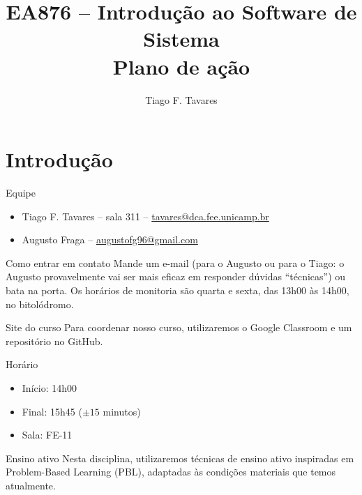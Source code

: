 \documentclass{beamer}
\title[01-Introdução]{EA876 -- Introdução ao Software de Sistema\\Plano de ação}
\author{Tiago F. Tavares}
\institute{FEEC -- UNICAMP}
\date{}
\begin{document}
\begin{frame}
  \titlepage
\end{frame}


\section{Introdução}

\begin{frame}{Equipe}

\begin{itemize}
  \item Tiago F. Tavares -- sala 311 -- \url{tavares@dca.fee.unicamp.br}
  \item Augusto Fraga -- \url{augustofg96@gmail.com}
\end{itemize}

\vskip 1cm

\begin{block}{Como entrar em contato}
  Mande um e-mail (para o Augusto ou para o Tiago: o Augusto provavelmente vai
  ser mais eficaz em responder dúvidas ``técnicas'') ou bata na porta.
  Os horários de monitoria são quarta e sexta, das 13h00 às 14h00, no bitolódromo.
\end{block}
\end{frame}


\begin{frame}{Site do curso}
\LARGE
Para coordenar nosso curso, utilizaremos o Google Classroom e um repositório no
GitHub.
\end{frame}

\begin{frame}{Horário}
\LARGE
\begin{itemize}
\item Início: 14h00
\item Final: 15h45 ($\pm 15$ minutos)
\item Sala: FE-11
\end{itemize}
\end{frame}

\begin{frame}{Ensino ativo}
\Large
Nesta disciplina, utilizaremos técnicas de ensino ativo inspiradas em
Problem-Based Learning (PBL), adaptadas às condições materiais que temos
atualmente.
\end{frame}
\end{document}
